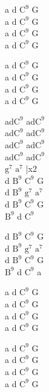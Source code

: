 \begin{chord}
    a d $\mathrm{C^9}$ G\\
    a d $\mathrm{C^9}$ G\\
    a d $\mathrm{C^9}$ G\\
    a d $\mathrm{C^9}$ G

    a d $\mathrm{C^9}$ G\\
    a d $\mathrm{C^9}$ G\\
    a d $\mathrm{C^9}$ G\\
    a d $\mathrm{C^9}$ G

    ad$\mathrm{C^9}$ ad$\mathrm{C^9}$\\
    ad$\mathrm{C^9}$ ad$\mathrm{C^9}$\\
    ad$\mathrm{C^9}$ ad$\mathrm{C^9}$\\
    ad$\mathrm{C^9}$ ad$\mathrm{C^9}$\\
    $\mathrm{g^7}$ $\mathrm{a^7}$ |x2\\
    d $\mathrm{B^9}$ $\mathrm{C^9}$ G\\
    d $\mathrm{B^9}$ $\mathrm{g^7}$ $\mathrm{a^7}$\\
    d $\mathrm{B^9}$ $\mathrm{C^9}$ G\\
    $\mathrm{B^9}$ d $\mathrm{C^9}$

    d $\mathrm{B^9}$ $\mathrm{C^9}$ G\\
    d $\mathrm{B^9}$ $\mathrm{g^7}$ $\mathrm{a^7}$\\
    d $\mathrm{B^9}$ $\mathrm{C^9}$ G\\
    $\mathrm{B^9}$ d $\mathrm{C^9}$ a

    a d $\mathrm{C^9}$ G\\
    a d $\mathrm{C^9}$ G\\
    a d $\mathrm{C^9}$ G\\
    a d $\mathrm{C^9}$ G

    a d $\mathrm{C^9}$ G\\
    a d $\mathrm{C^9}$ G\\
    a d $\mathrm{C^9}$ G\\
    a d $\mathrm{C^9}$ G
\end{chord}
